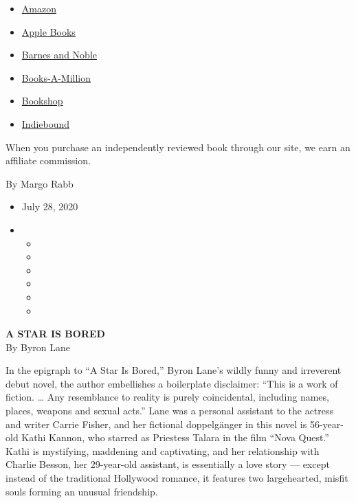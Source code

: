 \begin{itemize}
\tightlist
\item
  \href{https://www.amazon.com/gp/search?index=books\&tag=NYTBSREV-20\&field-keywords=A+Star+is+Bored+Bryon+Lane}{Amazon}
\item
  \href{https://du-gae-books-dot-nyt-du-prd.appspot.com/buy?title=A+Star+is+Bored\&author=Bryon+Lane}{Apple
  Books}
\item
  \href{https://www.anrdoezrs.net/click-7990613-11819508?url=https\%3A\%2F\%2Fwww.barnesandnoble.com\%2Fw\%2F\%3Fean\%3D9781250266491}{Barnes
  and Noble}
\item
  \href{https://www.anrdoezrs.net/click-7990613-35140?url=https\%3A\%2F\%2Fwww.booksamillion.com\%2Fp\%2FA\%2BStar\%2Bis\%2BBored\%2FBryon\%2BLane\%2F9781250266491}{Books-A-Million}
\item
  \href{https://bookshop.org/a/3546/9781250266491}{Bookshop}
\item
  \href{https://www.indiebound.org/book/9781250266491?aff=NYT}{Indiebound}
\end{itemize}

When you purchase an independently reviewed book through our site, we
earn an affiliate commission.

By Margo Rabb

\begin{itemize}
\item
  July 28, 2020
\item
  \begin{itemize}
  \item
  \item
  \item
  \item
  \item
  \item
  \end{itemize}
\end{itemize}

\textbf{A STAR IS BORED}\\
By Byron Lane

In the epigraph to ``A Star Is Bored,'' Byron Lane's wildly funny and
irreverent debut novel, the author embellishes a boilerplate disclaimer:
``This is a work of fiction. \ldots{} Any resemblance to reality is
purely coincidental, including names, places, weapons and sexual acts.''
Lane was a personal assistant to the actress and writer Carrie Fisher,
and her fictional doppelgänger in this novel is 56-year-old Kathi
Kannon, who starred as Priestess Talara in the film ``Nova Quest.''
Kathi is mystifying, maddening and captivating, and her relationship
with Charlie Besson, her 29-year-old assistant, is essentially a love
story --- except instead of the traditional Hollywood romance, it
features two largehearted, misfit souls forming an unusual friendship.

